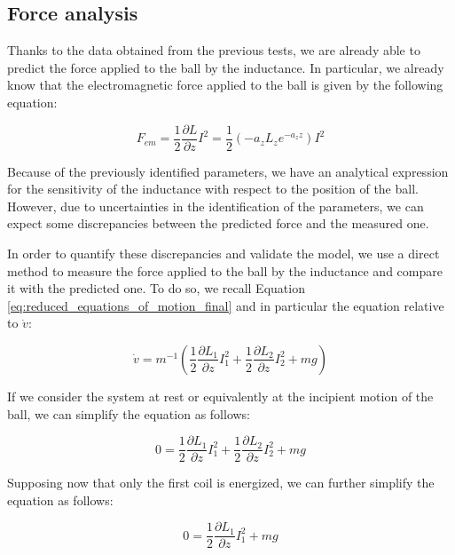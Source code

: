 \subsection{Force analysis}
\label{subsec:force_analysis}

Thanks to the data obtained from the previous tests, we are already able to predict the force applied to the ball by the inductance.
In particular, we already know that the electromagnetic force applied to the ball is given by the following equation:

\begin{equation}
    F_{em} = \frac{1}{2} \frac{\partial L}{\partial z} I^2 = \frac{1}{2} (-a_z L_z e^{-a_z z}) I^2
\end{equation}

Because of the previously identified parameters, we have an analytical expression for the sensitivity of the inductance with respect to the position of the ball.
However, due to uncertainties in the identification of the parameters, we can expect some discrepancies between the predicted force and the measured one.

In order to quantify these discrepancies and validate the model, we use a direct method to measure the force applied to the ball by the inductance and compare it with the predicted one.
To do so, we recall Equation \ref{eq:reduced_equations_of_motion_final} and in particular the equation relative to $\dot{v}$:

\begin{equation}
    \dot{v} = m^{-1} \left(\frac{1}{2} \frac{\partial L_1}{\partial z} I_1^2 + \frac{1}{2} \frac{\partial L_2}{\partial z} I_2^2 + m g  \right)
\end{equation}

If we consider the system at rest or equivalently at the incipient motion of the ball, we can simplify the equation as follows:

\begin{equation}
    0 = \frac{1}{2} \frac{\partial L_1}{\partial z} I_1^2 + \frac{1}{2} \frac{\partial L_2}{\partial z} I_2^2 + m g
\end{equation}

Supposing now that only the first coil is energized, we can further simplify the equation as follows:

\begin{equation}
    0 = \frac{1}{2} \frac{\partial L_1}{\partial z} I_1^2 + m g
\end{equation}

